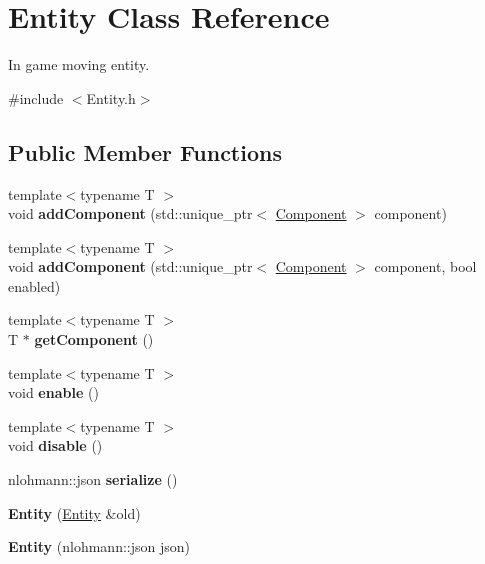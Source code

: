 \hypertarget{classEntity}{\section{Entity Class Reference}
\label{classEntity}
}


In game moving entity.  




{\ttfamily \#include $<$Entity.\-h$>$}

\subsection*{Public Member Functions}
\begin{DoxyCompactItemize}
\item 
\hypertarget{classEntity_afb2d2dd5bbd30e71802726cd45d630ae}{{\footnotesize template$<$typename T $>$ }\\void {\bfseries add\-Component} (std\-::unique\-\_\-ptr$<$ \hyperlink{classComponent}{Component} $>$ component)}\label{classEntity_afb2d2dd5bbd30e71802726cd45d630ae}

\item 
\hypertarget{classEntity_a845522369ff678f4c754f654e294a516}{{\footnotesize template$<$typename T $>$ }\\void {\bfseries add\-Component} (std\-::unique\-\_\-ptr$<$ \hyperlink{classComponent}{Component} $>$ component, bool enabled)}\label{classEntity_a845522369ff678f4c754f654e294a516}

\item 
\hypertarget{classEntity_a369c207eab2aed48053346a58b4cdbe2}{{\footnotesize template$<$typename T $>$ }\\T $\ast$ {\bfseries get\-Component} ()}\label{classEntity_a369c207eab2aed48053346a58b4cdbe2}

\item 
\hypertarget{classEntity_a03a490501ebcd0e26596099f40a7d1c2}{{\footnotesize template$<$typename T $>$ }\\void {\bfseries enable} ()}\label{classEntity_a03a490501ebcd0e26596099f40a7d1c2}

\item 
\hypertarget{classEntity_a8063a683992bb4fc567746cf2c5775a6}{{\footnotesize template$<$typename T $>$ }\\void {\bfseries disable} ()}\label{classEntity_a8063a683992bb4fc567746cf2c5775a6}

\item 
\hypertarget{classEntity_a5074110a6e1fc8b3e87cdee9032b5c92}{nlohmann\-::json {\bfseries serialize} ()}\label{classEntity_a5074110a6e1fc8b3e87cdee9032b5c92}

\item 
\hypertarget{classEntity_ad42e3c93df543d22f2bbc8f301fe90d7}{{\bfseries Entity} (\hyperlink{classEntity}{Entity} \&old)}\label{classEntity_ad42e3c93df543d22f2bbc8f301fe90d7}

\item 
\hypertarget{classEntity_a897eef416e1bdc1ab34349caac9da97f}{{\bfseries Entity} (nlohmann\-::json json)}\label{classEntity_a897eef416e1bdc1ab34349caac9da97f}

\end{DoxyCompactItemize}
